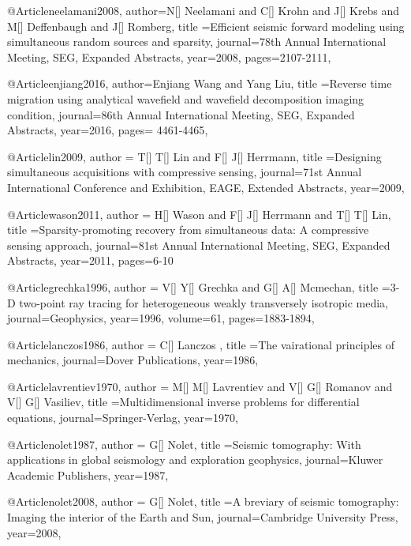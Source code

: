 {@Article{neelamani2008,
  author={N[] Neelamani and C[] Krohn and J[] Krebs and M[] Deffenbaugh and J[] Romberg},
  title ={Efficient seismic forward modeling using simultaneous random sources and sparsity},
  journal={78th Annual International Meeting, SEG, Expanded Abstracts},
  year=2008,
  pages={2107-2111},
}

@Article{enjiang2016,
  author={Enjiang Wang and Yang Liu},
  title ={Reverse time migration using analytical wavefield and wavefield decomposition imaging
condition},
  journal={86th Annual International Meeting, SEG, Expanded Abstracts},
  year=2016,
  pages={ 4461-4465},
}

@Article{lin2009,
  author = {T[] T[] Lin and F[] J[] Herrmann},
  title ={Designing simultaneous acquisitions with compressive sensing},
  journal={71st Annual International Conference and Exhibition, EAGE, Extended Abstracts},
  year=2009,
}

@Article{wason2011,
  author = {H[] Wason and F[] J[] Herrmann and T[] T[] Lin},
  title ={Sparsity-promoting recovery from simultaneous data: A compressive sensing approach},
  journal={81st Annual International Meeting, SEG, Expanded Abstracts},
  year=2011,
  pages={6-10}
}

@Article{grechka1996,
  author = {V[] Y[] Grechka and G[] A[] Mcmechan},
  title ={3-D two-point ray tracing for heterogeneous weakly transversely isotropic media},
  journal={Geophysics},
  year=1996,
  volume=61,
  pages={1883-1894},
}

@Article{lanczos1986,
  author = {C[] Lanczos },
  title ={The vairational principles of mechanics},
  journal={Dover Publications},
  year=1986,
}

@Article{lavrentiev1970,
  author = {M[] M[] Lavrentiev and V[] G[] Romanov and V[] G[] Vasiliev},
  title ={Multidimensional inverse problems for differential equations},
  journal={Springer-Verlag},
  year=1970,
}

@Article{nolet1987,
  author = {G[] Nolet},
  title ={Seismic tomography: With applications in global seismology and exploration geophysics},
  journal={Kluwer Academic Publishers},
  year=1987,
}

@Article{nolet2008,
  author = {G[] Nolet},
  title ={A breviary of seismic tomography: Imaging the interior of the Earth and Sun},
  journal={Cambridge University Press},
  year=2008,
}

}
